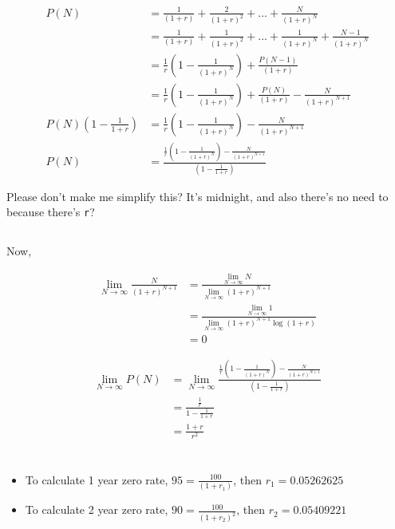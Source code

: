 \documentclass[11pt]{scrartcl}
\begin{document}
\begin{align*}
P(N) &= \frac{1}{(1+r)} + \frac{2}{(1+r)^2} + ... + \frac{N}{(1+r)^N} \\
&= \frac{1}{(1+r)} + \frac{1}{(1+r)^2} + ... + \frac{1}{(1+r)^N} + \frac{N-1}{(1+r)^N} \\
&= \frac{1}{r}\left(1-\frac{1}{(1+r)^N}\right) + \frac{P(N-1)}{(1+r)} \\
&= \frac{1}{r}\left(1-\frac{1}{(1+r)^N}\right) + \frac{P(N)}{(1+r)} - \frac{N}{(1+r)^{N+1}} \\
P(N) \left(1 - \frac{1}{1+r}\right) &= \frac{1}{r}\left(1-\frac{1}{(1+r)^N}\right) - \frac{N}{(1+r)^{N+1}} \\
P(N) &= \frac{\frac{1}{r}\left(1-\frac{1}{(1+r)^N}\right) - \frac{N}{(1+r)^{N+1}}}{\left(1 - \frac{1}{1+r}\right)}
\end{align*}

Please don't make me simplify this? It's midnight, and also there's no need to because there's \texttt{r}?

\subsection{}

Now,

\begin{align*}
\lim_{N \to \infty} \frac{N}{(1+r)^{N+1}} &= \frac{\lim_{N \to \infty} N}{\lim_{N \to \infty} (1+r)^{N+1}} \\
&= \frac{\lim_{N\to\infty}1}{\lim_{N\to\infty}(1+r)^{N+1} \log{(1+r)}} \\
&= 0
\end{align*}

\begin{align*}
\lim_{N \to \infty} P(N) &= \lim_{N \to \infty} \frac{\frac{1}{r}\left(1-\frac{1}{(1+r)^N}\right) - \frac{N}{(1+r)^{N+1}}}{\left(1 - \frac{1}{1+r}\right)} \\
&= \frac{\frac{1}{r}}{1-\frac{1}{1+r}} \\
&= \frac{1+r}{r^2}
\end{align*}

\section{}

\begin{itemize}
\item To calculate 1 year zero rate, $95 = \frac{100}{(1+r_1)}$, then $r_1 = 0.05262625$
\item To calculate 2 year zero rate, $90 = \frac{100}{(1+r_2)^2}$, then $r_2 = 0.05409221$
\end{itemize}
\end{document}
